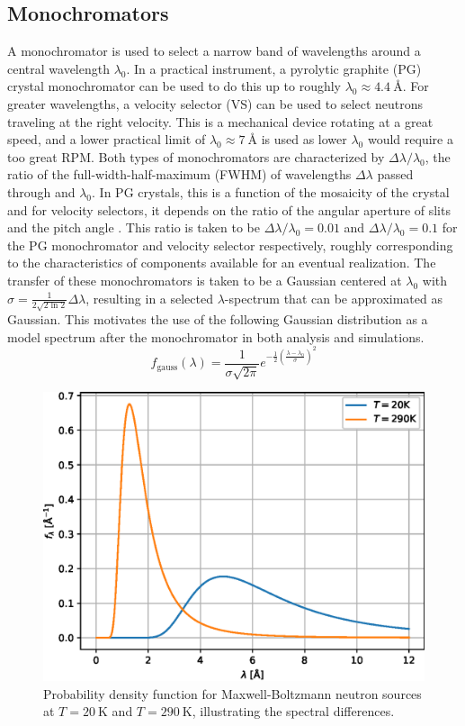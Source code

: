 \subsection{Monochromators}
A monochromator is used to select a narrow band of wavelengths around a central wavelength $\lambda_0$. In a practical instrument, a pyrolytic graphite (PG) crystal monochromator can be used to do this up to roughly $\lambda_0 \approx \SI{4.4}{\angstrom}$. For greater wavelengths, a velocity selector (VS) can be used to select neutrons traveling at the right velocity. This is a mechanical device rotating at a great speed, and a lower practical limit of $\lambda_0 \approx \SI{7}{\angstrom}$ is used as lower $\lambda_0$ would require a too great RPM. Both types of monochromators are characterized by $\Delta\lambda/\lambda_0$, the ratio of the full-width-half-maximum (FWHM) of wavelengths $\Delta\lambda$ passed through and $\lambda_0$. In PG crystals, this is a function of the mosaicity of the crystal \cite{shapiro1972} and for velocity selectors, it depends on the ratio of the angular aperture of slits and the pitch angle \cite{szewc2010}. This ratio is taken to be $\Delta\lambda/\lambda_0 = 0.01$ and $\Delta\lambda/\lambda_0 = 0.1$ for the PG monochromator and velocity selector respectively, roughly corresponding to the characteristics of components available for an eventual realization. The transfer of these monochromators is taken to be a Gaussian centered at $\lambda_0$ with $\sigma = \frac{1}{2\sqrt{2\ln 2}}\Delta\lambda$, resulting in a selected $\lambda$-spectrum that can be approximated as Gaussian. This motivates the use of the following Gaussian distribution as a model spectrum after the monochromator in both analysis and simulations.
\begin{equation}
	f_\text{gauss}(\lambda) = \frac{1}{\sigma\sqrt{2\pi}} e^{-\frac{1}{2}(\frac{\lambda - \lambda_0}{\sigma})^2} \label{eq:gauss-spectrum}
\end{equation}
\begin{figure}
	\centering
	\includegraphics[width=0.5\linewidth]{source-spectrum}
	\caption{Probability density function for Maxwell-Boltzmann neutron sources at $T = \SI{20}{\kelvin}$ and $T = \SI{290}{\kelvin}$, illustrating the spectral differences. }
	\label{fig:source-spectrum}
\end{figure}
